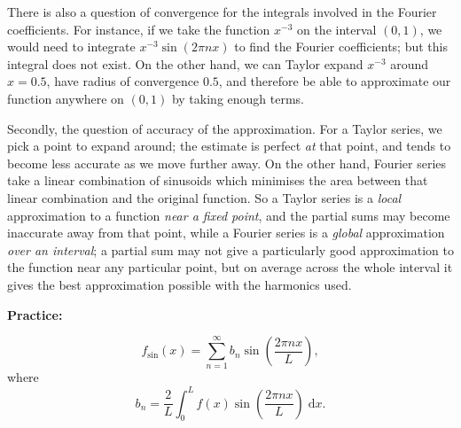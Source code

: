 \documentclass{article}
\newcommand{\diff}{\;\mathrm{d}}
\begin{document}
There is also a question of convergence for the integrals involved in the Fourier coefficients. For instance, if we take the function $x^{-3}$ on the interval $(0,1)$, we would need to integrate $x^{-3}\sin(2\pi nx)$ to find the Fourier coefficients; but this integral does not exist. On the other hand, we can Taylor expand $x^{-3}$ around $x=0.5$, have radius of convergence $0.5$, and therefore be able to approximate our function anywhere on $(0,1)$ by taking enough terms.\bigskip


Secondly, the question of accuracy of the approximation. For a Taylor series, we pick a point to expand around; the estimate is perfect \textit{at} that point, and tends to become less accurate as we move further away. On the other hand, Fourier series take a linear combination of sinusoids which minimises the area between that linear combination and the original function. So a Taylor series is a \textit{local} approximation to a function \textit{near a fixed point}, and the partial sums may become inaccurate away from that point, while a Fourier series is a \textit{global} approximation \textit{over an interval}; a partial sum may not give a particularly good approximation to the function near any particular point, but on average across the whole interval it gives the best approximation possible with the harmonics used.











\clearpage





\textbf{Practice:}\bigskip

\[f_\mathrm{sin}(x)=\sum_{n=1}^\infty b_n\sin\left(\frac{2\pi nx}{L}\right),\]
where
\[b_n = \frac{2}{L}\int_0^L f(x)\sin\left(\frac{2\pi nx}{L}\right)\diff x.\]
\end{document}
